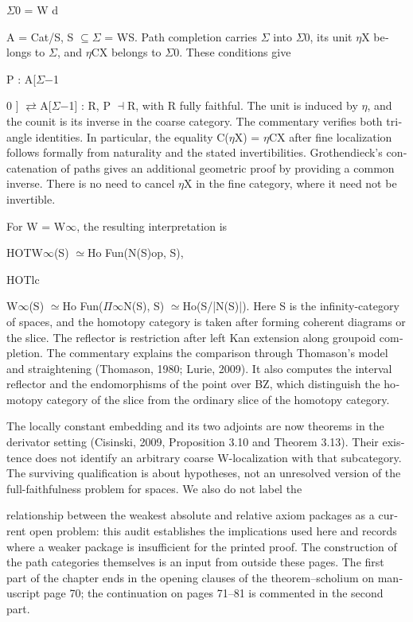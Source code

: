 \begin{otherlanguage}{english}
\ensuremath{\Sigma}0 = W d


A = Cat/S, S \ensuremath{\subseteq}\ensuremath{\Sigma} = WS. Path completion carries \ensuremath{\Sigma} into \ensuremath{\Sigma}0, its unit \ensuremath{\eta}X belongs to \ensuremath{\Sigma}, and \ensuremath{\eta}CX belongs to \ensuremath{\Sigma}0. These conditions give


P : A[\ensuremath{\Sigma}\ensuremath{-}1


0 ] \ensuremath{\rightleftarrows}A[\ensuremath{\Sigma}\ensuremath{-}1] : R, P \ensuremath{\dashv}R, with R fully faithful. The unit is induced by \ensuremath{\eta}, and the counit is its inverse in the coarse category. The commentary verifies both triangle identities. In particular, the equality C(\ensuremath{\eta}X) = \ensuremath{\eta}CX after fine localization follows formally from naturality and the stated invertibilities. Grothendieck’s concatenation of paths gives an additional geometric proof by providing a common inverse. There is no need to cancel \ensuremath{\eta}X in the fine category, where it need not be invertible.


For W = W\ensuremath{\infty}, the resulting interpretation is


HOTW\ensuremath{\infty}(S) \ensuremath{\simeq}Ho Fun(N(S)op, S),


HOTlc


W\ensuremath{\infty}(S) \ensuremath{\simeq}Ho Fun(\ensuremath{\Pi}\ensuremath{\infty}N(S), S) \ensuremath{\simeq}Ho(S/|N(S)|). Here S is the infinity-category of spaces, and the homotopy category is taken after forming coherent diagrams or the slice. The reflector is restriction after left Kan extension along groupoid completion. The commentary explains the comparison through Thomason’s model and straightening (Thomason, 1980; Lurie, 2009). It also computes the interval reflector and the endomorphisms of the point over BZ, which distinguish the homotopy category of the slice from the ordinary slice of the homotopy category.


The locally constant embedding and its two adjoints are now theorems in the derivator setting (Cisinski, 2009, Proposition 3.10 and Theorem 3.13). Their existence does not identify an arbitrary coarse W-localization with that subcategory. The surviving qualification is about hypotheses, not an unresolved version of the full-faithfulness problem for spaces. We also do not label the


relationship between the weakest absolute and relative axiom packages as a current open problem: this audit establishes the implications used here and records where a weaker package is insufficient for the printed proof. The construction of the path categories themselves is an input from outside these pages. The first part of the chapter ends in the opening clauses of the theorem--scholium on manuscript page 70; the continuation on pages 71--81 is commented in the second part.
\end{otherlanguage}
\dgrchunkend

